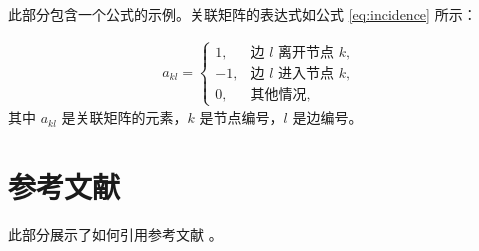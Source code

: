 \documentclass[a4paper,UTF8]{ctexart}
\begin{document}
此部分包含一个公式的示例。关联矩阵的表达式如公式 \ref{eq:incidence} 所示：

\begin{align}\label{eq:incidence}
    a_{kl}=
    \begin{cases}
        1,  & \text{边 $l$ 离开节点 $k$},\\
        -1, & \text{边 $l$ 进入节点 $k$},\\
        0,  & \text{其他情况},
    \end{cases}
\end{align}
其中 $a_{kl}$ 是关联矩阵的元素，$k$ 是节点编号，$l$ 是边编号。

\section{参考文献}

此部分展示了如何引用参考文献 \cite{article1}。



\end{document}
